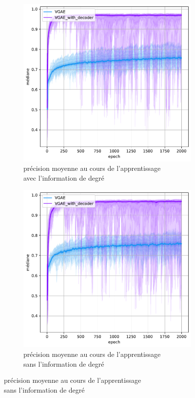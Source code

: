 \documentclass{article}
\begin{document}
\begin{figure}[H]
    \centering
    \captionsetup{justification=centering}
    \begin{subfigure}{0.45\textwidth}
      \includegraphics[width=\textwidth]{graphics/APs_degree_decoder_cinf.svg.pdf}
      \centering
      \caption{précision moyenne au cours de l'apprentissage\\ avec l'information de degré}
    \end{subfigure}
    \begin{subfigure}{0.45\textwidth}
      \includegraphics[width=\textwidth]{graphics/APs_no_degree_decoder_cinf.svg.pdf}
      \centering
      \caption{précision moyenne au cours de l'apprentissage\\ sans l'information de degré}
    \end{subfigure}
    

\end{figure}
\end{document}
